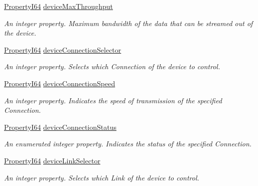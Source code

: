 \begin{DoxyCompactItemize}
\hyperlink{group___common_interface_ga81749b2696755513663492664a18a893}{Property\+I64} \hyperlink{classmv_i_m_p_a_c_t_1_1acquire_1_1_gen_i_cam_1_1_device_control_a642ae01705aed49770f65e18da80e1a4}{device\+Max\+Throughput}
\begin{DoxyCompactList}\small\item\em An integer property. Maximum bandwidth of the data that can be streamed out of the device. \end{DoxyCompactList}\item 
\hyperlink{group___common_interface_ga81749b2696755513663492664a18a893}{Property\+I64} \hyperlink{classmv_i_m_p_a_c_t_1_1acquire_1_1_gen_i_cam_1_1_device_control_a1f72049fbb30bfcb8fd0ca6582ea5f16}{device\+Connection\+Selector}
\begin{DoxyCompactList}\small\item\em An integer property. Selects which Connection of the device to control. \end{DoxyCompactList}\item 
\hyperlink{group___common_interface_ga81749b2696755513663492664a18a893}{Property\+I64} \hyperlink{classmv_i_m_p_a_c_t_1_1acquire_1_1_gen_i_cam_1_1_device_control_a8c2446d5d474ae2805b3f56050361686}{device\+Connection\+Speed}
\begin{DoxyCompactList}\small\item\em An integer property. Indicates the speed of transmission of the specified Connection. \end{DoxyCompactList}\item 
\hyperlink{group___common_interface_ga81749b2696755513663492664a18a893}{Property\+I64} \hyperlink{classmv_i_m_p_a_c_t_1_1acquire_1_1_gen_i_cam_1_1_device_control_a68a59391330be62153347f31044a8b5e}{device\+Connection\+Status}
\begin{DoxyCompactList}\small\item\em An enumerated integer property. Indicates the status of the specified Connection. \end{DoxyCompactList}\item 
\hyperlink{group___common_interface_ga81749b2696755513663492664a18a893}{Property\+I64} \hyperlink{classmv_i_m_p_a_c_t_1_1acquire_1_1_gen_i_cam_1_1_device_control_a7ad8c7f703e9d2587dd376ee55a699da}{device\+Link\+Selector}
\begin{DoxyCompactList}\small\item\em An integer property. Selects which Link of the device to control. \end{DoxyCompactList}\item 

\end{DoxyCompactItemize}
